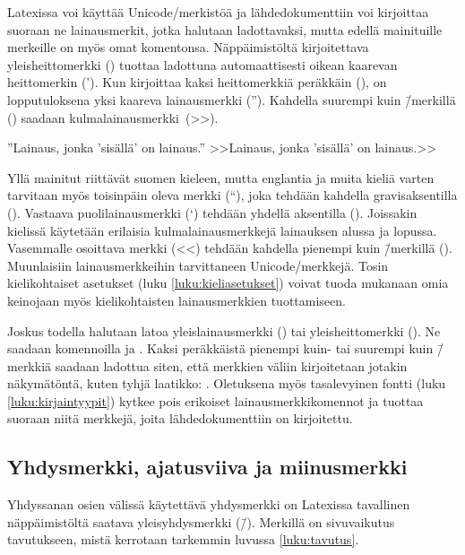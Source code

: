 Latexissa voi käyttää Unicode\-/merkistöä ja lähdedokumenttiin voi
kirjoittaa suoraan ne lainausmerkit, jotka halutaan ladottavaksi, mutta
edellä mainituille merkeille on myös omat komentonsa. Näppäimistöltä
kirjoitettava yleisheittomerkki () tuottaa ladottuna
automaattisesti oikean kaarevan heittomerkin ('). Kun kirjoittaa kaksi
heittomerkkiä peräkkäin (), on lopputuloksena yksi kaareva
lainausmerkki (''). Kahdella suurempi kuin \=/merkillä (\koodi{>>})
saadaan kulmalainausmerkki~(>>).

\begin{koodilohkosis}
  ''Lainaus, jonka 'sisällä' on lainaus.''
  >>Lainaus, jonka 'sisällä' on lainaus.>>
\end{koodilohkosis}

Yllä mainitut riittävät suomen kieleen, mutta englantia ja muita kieliä
varten tarvitaan myös toisinpäin oleva merkki (``), joka tehdään
kahdella gra\-vis\-ak\-sen\-til\-la (). Vastaava
puolilainausmerkki (`) tehdään yhdellä aksentilla (). Joissakin
kielissä käytetään erilaisia kulmalainausmerkkejä lainauksen alussa ja
lopussa. Vasemmalle osoittava merkki (<<) tehdään kahdella pienempi kuin
\=/merkillä (\koodi{<<}). Muunlaisiin lainausmerkkeihin tarvittaneen
Unicode\-/merkkejä. Tosin kielikohtaiset asetukset (luku
\ref{luku:kieliasetukset}) voivat tuoda mukanaan omia keinojaan myös
kielikohtaisten lainausmerkkien tuottamiseen.

Joskus todella halutaan latoa yleislainausmerkki (\textquotedbl) tai
yleisheittomerkki (\textquotesingle). Ne saadaan komennoilla
 ja . Kaksi
peräkkäistä pienempi kuin- tai suurempi kuin \=/merkkiä saadaan ladottua
siten, että merkkien väliin kirjoitetaan jotakin näkymätöntä, kuten
tyhjä laatikko: \mbox{}. Oletuksena myös
tasalevyinen fontti (luku \ref{luku:kirjaintyypit}) kytkee pois
erikoiset lainausmerkkikomennot ja tuottaa suoraan niitä merkkejä, joita
lähdedokumenttiin on kirjoitettu.

\subsection{Yhdysmerkki, ajatusviiva ja miinusmerkki}

Yhdyssanan osien välissä käytettävä yhdysmerkki on Latexissa tavallinen
näppäimistöltä saatava yleis\-yh\-dys\-merk\-ki (\=/). Merkillä on
sivuvaikutus tavutukseen, mistä kerrotaan tarkemmin luvussa
\ref{luku:tavutus}.

